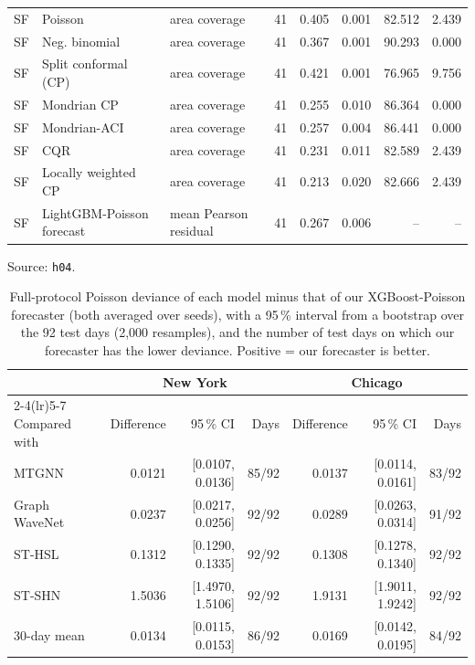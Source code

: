 \documentclass[11pt]{article}
\begin{document}
\begin{table}[H]
\begin{tabularx}{\linewidth}{ll>{\raggedright\arraybackslash}Xrrrrr}
SF & Poisson & area coverage & 41 & 0.405 & 0.001 & 82.512 & 2.439 \\
SF & Neg. binomial & area coverage & 41 & 0.367 & 0.001 & 90.293 & 0.000 \\
SF & Split conformal (CP) & area coverage & 41 & 0.421 & 0.001 & 76.965 & 9.756 \\
SF & Mondrian CP & area coverage & 41 & 0.255 & 0.010 & 86.364 & 0.000 \\
SF & Mondrian-ACI & area coverage & 41 & 0.257 & 0.004 & 86.441 & 0.000 \\
SF & CQR & area coverage & 41 & 0.231 & 0.011 & 82.589 & 2.439 \\
SF & Locally weighted CP & area coverage & 41 & 0.213 & 0.020 & 82.666 & 2.439 \\
SF & LightGBM-Poisson forecast & mean Pearson residual & 41 & 0.267 & 0.006 & -- & -- \\
\bottomrule\end{tabularx}\end{table}

\begin{table}[H]\centering\small\setlength{\tabcolsep}{3.5pt}
\caption{Full-protocol Poisson deviance of each model minus that of our XGBoost-Poisson forecaster (both averaged over seeds), with a 95\,\% interval from a bootstrap over the 92 test days (2{,}000 resamples), and the number of test days on which our forecaster has the lower deviance. Positive = our forecaster is better.} Source: \texttt{h04}.\label{tab:s13}
\begin{tabular}{lrrrrrr}\toprule
 & \multicolumn{3}{c}{New York} & \multicolumn{3}{c}{Chicago}\\\cmidrule(lr){2-4}\cmidrule(lr){5-7}
Compared with & Difference & 95\,\% CI & Days & Difference & 95\,\% CI & Days\\\midrule
MTGNN & 0.0121 & [0.0107, 0.0136] & 85/92 & 0.0137 & [0.0114, 0.0161] & 83/92 \\
Graph WaveNet & 0.0237 & [0.0217, 0.0256] & 92/92 & 0.0289 & [0.0263, 0.0314] & 91/92 \\
ST-HSL & 0.1312 & [0.1290, 0.1335] & 92/92 & 0.1308 & [0.1278, 0.1340] & 92/92 \\
ST-SHN & 1.5036 & [1.4970, 1.5106] & 92/92 & 1.9131 & [1.9011, 1.9242] & 92/92 \\
30-day mean & 0.0134 & [0.0115, 0.0153] & 86/92 & 0.0169 & [0.0142, 0.0195] & 84/92 \\
\bottomrule\end{tabular}\end{table}
\end{document}
